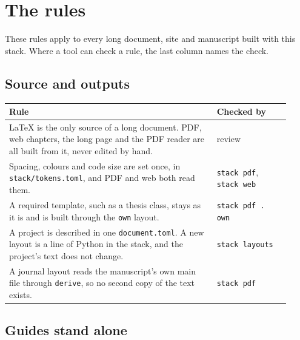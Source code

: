 \chapter{The rules}
\label{ch:rules}

These rules apply to every long document, site and manuscript built with this stack. Where a tool can check a rule, the last column names the check.

\section{Source and outputs}

\begin{longtable}{p{0.68\linewidth}p{0.24\linewidth}}
\toprule
Rule & Checked by \\
\midrule
LaTeX is the only source of a long document. PDF, web chapters, the long page and the PDF reader are all built from it, never edited by hand. & review \\
Spacing, colours and code size are set once, in \texttt{stack/tokens.toml}, and PDF and web both read them. & \texttt{stack pdf}, \texttt{stack web} \\
A required template, such as a thesis class, stays as it is and is built through the \texttt{own} layout. & \texttt{stack pdf . own} \\
A project is described in one \texttt{document.toml}. A new layout is a line of Python in the stack, and the project's text does not change. & \texttt{stack layouts} \\
A journal layout reads the manuscript's own main file through \texttt{derive}, so no second copy of the text exists. & \texttt{stack pdf} \\
\bottomrule
\end{longtable}

\section{Guides stand alone}

